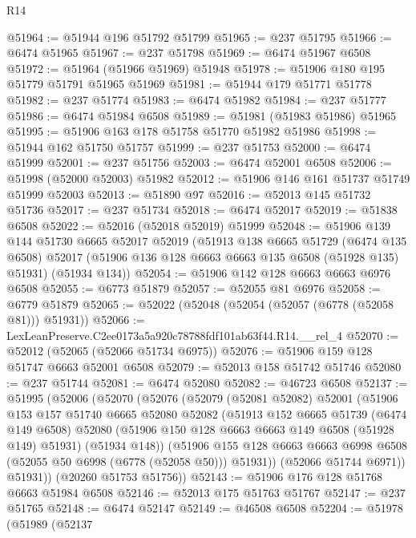 \begin{lexlean}{R14}
\begin{coremodule}
@51964 := @51944 @196 @51792 @51799
@51965 := @237 @51795
@51966 := @6474 @51965
@51967 := @237 @51798
@51969 := @6474 @51967 @6508
@51972 := @51964 (@51966 @51969) @51948
@51978 := @51906 @180 @195 @51779 @51791 @51965 @51969
@51981 := @51944 @179 @51771 @51778
@51982 := @237 @51774
@51983 := @6474 @51982
@51984 := @237 @51777
@51986 := @6474 @51984 @6508
@51989 := @51981 (@51983 @51986) @51965
@51995 := @51906 @163 @178 @51758 @51770 @51982 @51986
@51998 := @51944 @162 @51750 @51757
@51999 := @237 @51753
@52000 := @6474 @51999
@52001 := @237 @51756
@52003 := @6474 @52001 @6508
@52006 := @51998 (@52000 @52003) @51982
@52012 := @51906 @146 @161 @51737 @51749 @51999 @52003
@52013 := @51890 @97
@52016 := @52013 @145 @51732 @51736
@52017 := @237 @51734
@52018 := @6474 @52017
@52019 := @51838 @6508
@52022 := @52016 (@52018 @52019) @51999
@52048 := @51906
    @139
    @144
    @51730
    @6665
    @52017
    @52019
    (@51913
      @138
      @6665
      @51729
      (@6474 @135 @6508)
      @52017
      (@51906 @136 @128 @6663 @6663 @135 @6508 (@51928 @135) @51931)
      (@51934 @134))
@52054 := @51906 @142 @128 @6663 @6663 @6976 @6508
@52055 := @6773 @51879
@52057 := @52055 @81 @6976
@52058 := @6779 @51879
@52065 := @52022 (@52048 (@52054 (@52057 (@6778 (@52058 @81))) @51931))
@52066 := LexLeanPreserve.C2ee0173a5a920c78788fdf101ab63f44.R14.__rel_4
@52070 := @52012 (@52065 (@52066 @51734 @6975))
@52076 := @51906 @159 @128 @51747 @6663 @52001 @6508
@52079 := @52013 @158 @51742 @51746
@52080 := @237 @51744
@52081 := @6474 @52080
@52082 := @46723 @6508
@52137 := @51995
    (@52006
      (@52070
        (@52076
          (@52079
            (@52081 @52082)
            @52001
            (@51906
              @153
              @157
              @51740
              @6665
              @52080
              @52082
              (@51913
                @152
                @6665
                @51739
                (@6474 @149 @6508)
                @52080
                (@51906 @150 @128 @6663 @6663 @149 @6508 (@51928 @149) @51931)
                (@51934 @148))
              (@51906
                @155
                @128
                @6663
                @6663
                @6998
                @6508
                (@52055 @50 @6998 (@6778 (@52058 @50)))
                @51931))
            (@52066 @51744 @6971))
          @51931))
      (@20260 @51753 @51756))
@52143 := @51906 @176 @128 @51768 @6663 @51984 @6508
@52146 := @52013 @175 @51763 @51767
@52147 := @237 @51765
@52148 := @6474 @52147
@52149 := @46508 @6508
@52204 := @51978
    (@51989
      (@52137

\end{coremodule}
\end{lexlean}
